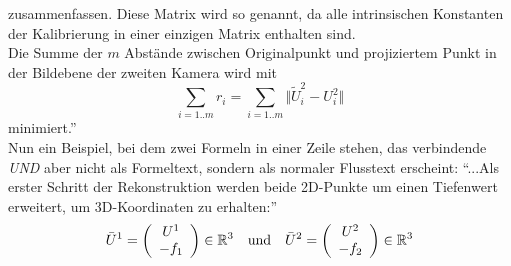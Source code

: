 zusammenfassen. Diese Matrix wird so genannt, da alle intrinsischen Konstanten der Kalibrierung in einer einzigen Matrix enthalten sind. \\
%
Die Summe der $m$ Abstände zwischen Originalpunkt und projiziertem Punkt in der Bildebene der zweiten Kamera wird mit
\begin{equation}
	\sum_{i=1..m}r_i = \sum_{i=1..m} \Vert\tilde U^2_i - U^2_i \Vert
\end{equation}
minimiert.''\\
%

Nun ein Beispiel, bei dem zwei Formeln in einer Zeile stehen, das verbindende \textit{UND} aber nicht als Formeltext, sondern als normaler Flusstext erscheint: ``...Als erster Schritt der Rekonstruktion werden beide 2D-Punkte um einen Tiefenwert erweitert, um 3D-Koordinaten zu erhalten:''
%
\begin{equation}
	\bar{U}^1=\left(\begin{array}{c}U^1\\-f_1\end{array}\right) \in \mathbb R^3 \quad \mbox{und} \quad
	\bar{U}^2=\left(\begin{array}{c}U^2\\-f_2\end{array}\right) \in \mathbb R^3
\end{equation}
%


